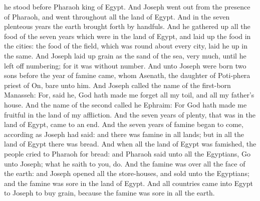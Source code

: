 he stood before Pharaoh king of Egypt. And Joseph went out from the presence of Pharaoh, and went throughout all the land of Egypt. And in the seven plenteous years the earth brought forth by handfuls. And he gathered up all the food of the seven years which were in the land of Egypt, and laid up the food in the cities: the food of the field, which was round about every city, laid he up in the same. And Joseph laid up grain as the sand of the sea, very much, until he left off numbering; for it was without number. And unto Joseph were born two sons before the year of famine came, whom Asenath, the daughter of Poti-phera priest of On, bare unto him. And Joseph called the name of the first-born Manasseh: For, said he, God hath made me forget all my toil, and all my father’s house. And the name of the second called he Ephraim: For God hath made me fruitful in the land of my affliction. And the seven years of plenty, that was in the land of Egypt, came to an end. And the seven years of famine began to come, according as Joseph had said: and there was famine in all lands; but in all the land of Egypt there was bread. And when all the land of Egypt was famished, the people cried to Pharaoh for bread: and Pharaoh said unto all the Egyptians, Go unto Joseph; what he saith to you, do. And the famine was over all the face of the earth: and Joseph opened all the store-houses, and sold unto the Egyptians; and the famine was sore in the land of Egypt. And all countries came into Egypt to Joseph to buy grain, because the famine was sore in all the earth. 


